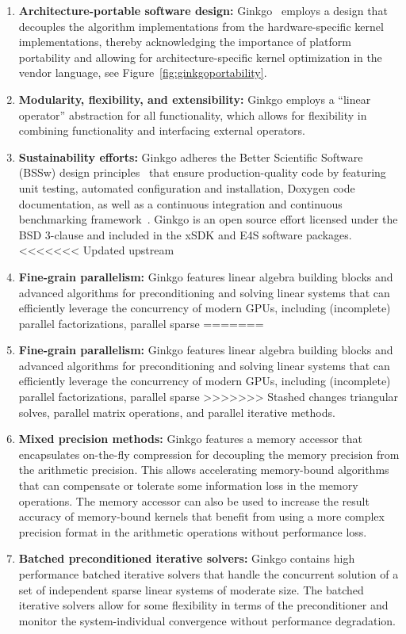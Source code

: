 \begin{enumerate}
  \item \textbf{Architecture-portable software design:}
		Ginkgo~\cite{anzt2020ginkgo} employs a design that decouples the
		algorithm implementations from the hardware-specific kernel
		implementations, thereby acknowledging the importance of platform
		portability and allowing for architecture-specific kernel optimization
		in the vendor language, see Figure~\ref{fig:ginkgoportability}.
  \item \textbf{Modularity, flexibility, and extensibility:} Ginkgo employs a
		``linear operator'' abstraction for all functionality, which allows for
		flexibility in combining functionality and interfacing external
		operators.
  \item \textbf{Sustainability efforts:} Ginkgo adheres the Better Scientific
		Software (BSSw) design principles~\cite{betterscientificsoftware} that
		ensure production-quality code by featuring unit testing, automated
		configuration and installation, Doxygen code documentation, as well as a
		continuous integration and continuous benchmarking
		framework~\cite{pasc_anzt}. Ginkgo is an open source effort licensed
		under the BSD 3-clause and included in the xSDK and E4S software
		packages.
<<<<<<< Updated upstream
  \item \textbf{Fine-grain parallelism:} Ginkgo features linear algebra building
		blocks and advanced algorithms for preconditioning and solving linear
		systems that can efficiently leverage the concurrency of modern GPUs,
		including (incomplete) parallel factorizations, parallel sparse
=======
  \item \textbf{Fine-grain parallelism:} Ginkgo features linear algebra
		building blocks and advanced algorithms for preconditioning and solving
		linear systems that can efficiently leverage the concurrency of modern
		GPUs, including (incomplete) parallel factorizations, parallel sparse
>>>>>>> Stashed changes
		triangular solves, parallel matrix operations, and parallel iterative
		methods.
  \item \textbf{Mixed precision methods:} Ginkgo features a memory accessor
		that encapsulates on-the-fly compression for decoupling the memory
		precision from the arithmetic precision. This allows accelerating
		memory-bound algorithms that can compensate or tolerate some information
		loss in the memory operations. The memory accessor can also be used to
		increase the result accuracy of memory-bound kernels that benefit from
		using a more complex precision format in the arithmetic operations
		without performance loss.
  \item \textbf{Batched preconditioned iterative solvers:} Ginkgo contains high
		performance batched iterative solvers that handle the concurrent
		solution of a set of independent sparse linear systems of moderate size.
		The batched iterative solvers allow for some flexibility in terms of the
		preconditioner and monitor the system-individual convergence without
		performance degradation.
\end{enumerate}

